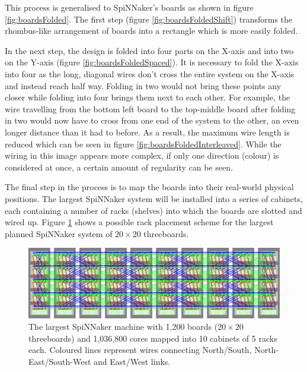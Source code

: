 			This process is generalised to SpiNNaker's boards as shown in figure
			\ref{fig:boardsFolded}. The first step (figure
			\ref{fig:boardsFoldedShift}) transforms the rhombus-like arrangement of
			boards into a rectangle which is more easily folded.
			
			In the next step, the design is folded into four parts on the X-axis and
			into two on the Y-axis (figure \ref{fig:boardsFoldedSpaced}). It is
			necessary to fold the X-axis into four as the long, diagonal wires don't
			cross the entire system on the X-axis and instead reach half way. Folding
			in two would not bring these points any closer while folding into four
			brings them next to each other. For example, the wire travelling from the
			bottom left board to the top-middle board after folding in two would now
			have to cross from one end of the system to the other, an even longer
			distance than it had to before. As a result, the maximum wire length is
			reduced which can be seen in figure \ref{fig:boardsFoldedInterleaved}.
			While the wiring in this image appears more complex, if only one direction
			(colour) is considered at once, a certain amount of regularity can be
			seen.
			
			\label{sec:mapping-spinnaker-to-cabinets}
			
			The final step in the process is to map the boards into their real-world
			physical positions. The largest SpiNNaker system will be installed into a
			series of cabinets, each containing a number of racks (shelves) into which
			the boards are slotted and wired up. Figure \ref{fig:spinnaker106} shows a
			possible rack placement scheme for the largest planned SpiNNaker system of
			$20\times20$ threeboards.
			
			\begin{figure}
				\center
				\includegraphics[width=\textwidth]{figures/spinnaker106}
				\caption[SpiNNaker machine mapped into cabinets and racks.]{The largest
				SpiNNaker machine with 1,200 boards ($20\times20$ threeboards) and
				1,036,800 cores mapped into 10 cabinets of 5 racks each.  Coloured lines
				represent wires connecting {\color{red}North/South},
				{\color{green}North-East/South-West} and {\color{blue}East/West} links.}
				\label{fig:spinnaker106}
			\end{figure}
			
